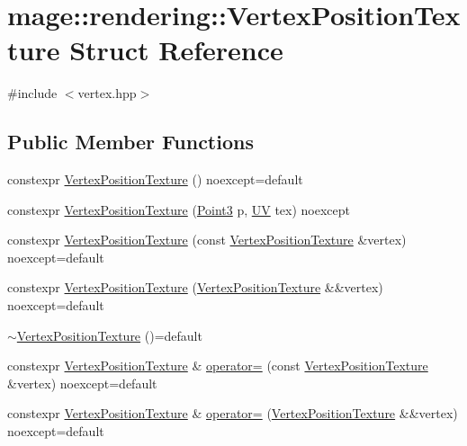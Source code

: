 \hypertarget{structmage_1_1rendering_1_1_vertex_position_texture}{}\section{mage\+:\+:rendering\+:\+:Vertex\+Position\+Texture Struct Reference}
\label{structmage_1_1rendering_1_1_vertex_position_texture}


{\ttfamily \#include $<$vertex.\+hpp$>$}

\subsection*{Public Member Functions}
\begin{DoxyCompactItemize}
\item 
constexpr \hyperlink{structmage_1_1rendering_1_1_vertex_position_texture_ac9f9c56c37af249a5c37145d4fed90fb}{Vertex\+Position\+Texture} () noexcept=default
\item 
constexpr \hyperlink{structmage_1_1rendering_1_1_vertex_position_texture_a71b7340eb44f39977a0aa11254ba5970}{Vertex\+Position\+Texture} (\hyperlink{structmage_1_1_point3}{Point3} p, \hyperlink{structmage_1_1_u_v}{UV} tex) noexcept
\item 
constexpr \hyperlink{structmage_1_1rendering_1_1_vertex_position_texture_a71d4ad888123a6772fabc6ad4a57ec25}{Vertex\+Position\+Texture} (const \hyperlink{structmage_1_1rendering_1_1_vertex_position_texture}{Vertex\+Position\+Texture} \&vertex) noexcept=default
\item 
constexpr \hyperlink{structmage_1_1rendering_1_1_vertex_position_texture_a8375ccf375d78d9203b130cee95982f4}{Vertex\+Position\+Texture} (\hyperlink{structmage_1_1rendering_1_1_vertex_position_texture}{Vertex\+Position\+Texture} \&\&vertex) noexcept=default
\item 
\hyperlink{structmage_1_1rendering_1_1_vertex_position_texture_afe6c0d05326d35c13f5d505065235691}{$\sim$\+Vertex\+Position\+Texture} ()=default
\item 
constexpr \hyperlink{structmage_1_1rendering_1_1_vertex_position_texture}{Vertex\+Position\+Texture} \& \hyperlink{structmage_1_1rendering_1_1_vertex_position_texture_aad5780884dc5ffe0b923885a4b67b83f}{operator=} (const \hyperlink{structmage_1_1rendering_1_1_vertex_position_texture}{Vertex\+Position\+Texture} \&vertex) noexcept=default
\item 
constexpr \hyperlink{structmage_1_1rendering_1_1_vertex_position_texture}{Vertex\+Position\+Texture} \& \hyperlink{structmage_1_1rendering_1_1_vertex_position_texture_a6bf7ada3b933e5790349225ee323db36}{operator=} (\hyperlink{structmage_1_1rendering_1_1_vertex_position_texture}{Vertex\+Position\+Texture} \&\&vertex) noexcept=default
\end{DoxyCompactItemize}
